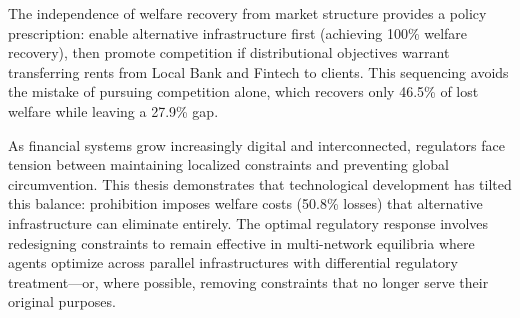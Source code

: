 The independence of welfare recovery from market structure provides a policy prescription: enable alternative infrastructure first (achieving 100\% welfare recovery), then promote competition if distributional objectives warrant transferring rents from Local Bank and Fintech to clients. This sequencing avoids the mistake of pursuing competition alone, which recovers only 46.5\% of lost welfare while leaving a 27.9\% gap.

As financial systems grow increasingly digital and interconnected, regulators face tension between maintaining localized constraints and preventing global circumvention. This thesis demonstrates that technological development has tilted this balance: prohibition imposes welfare costs (50.8\% losses) that alternative infrastructure can eliminate entirely. The optimal regulatory response involves redesigning constraints to remain effective in multi-network equilibria where agents optimize across parallel infrastructures with differential regulatory treatment—or, where possible, removing constraints that no longer serve their original purposes.